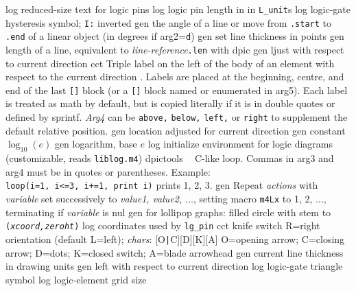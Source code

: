 %
  {log}%
  {reduced-size text for logic pins}%
%
  {log}%
  {logic pin length in in {\tt L\_unit}s}%
%
  {log}%
  {logic-gate hysteresis symbol; {\tt I:} inverted}%
%
  {gen}%
  {the angle of a line or move from {\tt .start} to {\tt .end} of a linear
   object (in degrees if arg2={\tt d})}%
%
  {gen}%
  {set line thickness in points}%
%
  {gen}%
  {length of a line, equivalent to {\sl line-reference}{\tt .len}
   with dpic}%
%
  {gen}%
  {ljust with respect to current direction}%
%
  {cct}%
  {Triple label on the left of the body of an element with respect to the
    current direction .  Labels are placed at the
    beginning, centre, and end of the last {\tt []} block (or a {\tt []} block
    named or enumerated in arg5). Each label is treated as math by
    default, but is copied literally if it is in double quotes or defined
    by sprintf.  {\sl Arg4} can be {\tt above,} {\tt below,} {\tt left,}
    or {\tt right} to supplement the default relative position.}%
%
  {gen}%
  {location adjusted for current direction}%
%
  {gen}%
  {constant $\log_{10}(e)$}%
%
  {gen}%
  {logarithm, base $e$}%
%
  {log}%
  {initialize environment for logic diagrams
    (customizable, reads {\tt liblog.m4})}%
%
  {dpictools}%
  {$\;\;$ C-like loop.  Commas in arg3 and arg4 must
    be in quotes or parentheses. Example:\\
    {\tt loop(i=1, i<=3, i+=1, print i)} prints 1, 2, 3.}%
%
  {gen}%
  {Repeat {\sl actions} with {\sl variable} set successively to
   {\sl value1, value2, $\ldots$}, setting macro {\tt m4Lx} to 1, 2,
   $\ldots$, terminating if {\sl variable} is nul}%
 {gen}%
  {for lollipop graphs: filled circle with stem to
    {\tt ({\sl xcoord,zeroht})}}%
%
  {log}%
  {coordinates used by {\tt lg\_pin}}%
%
  {cct}%
  {knife switch R=right orientation (default L=left);
    {\sl chars}: [O{\tt|}C][D][K][A] O=opening arrow; C=closing arrow;
    D=dots; K=closed switch; A=blade arrowhead }%
%
  {gen}%
  {current line thickness in drawing units}%
%
  {gen}%
  {left with respect to current direction}%
%
  {log}%
  {logic-gate triangle symbol}%
%
  {log}%
  {logic-element grid size}%

